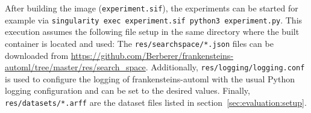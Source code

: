 After building the image (\texttt{experiment.sif}), the experiments can be started for example via \texttt{singularity exec experiment.sif python3 experiment.py}.\newline
This execution assumes the following file setup in the same directory where the built container is located and used:
The \texttt{res/searchspace/*.json} files can be downloaded from \url{https://github.com/Berberer/frankensteins-automl/tree/master/res/search_space}.
Additionally, \texttt{res/logging/logging.conf} is used to configure the logging of frankensteins-automl with the usual Python logging configuration and can be set to the desired values.
Finally, \texttt{res/datasets/*.arff} are the dataset files listed in section~\ref{sec:evaluation:setup}.
